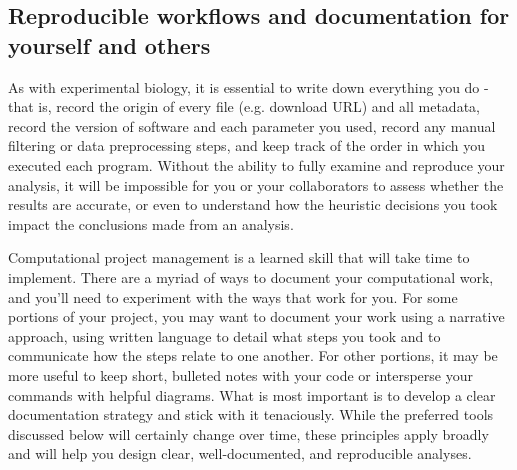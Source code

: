 \documentclass[10pt,letterpaper]{article}
\begin{document}




\subsection*{Reproducible workflows and documentation for yourself and others}
As with experimental biology, it is essential to write down everything you do - that is, record the origin of every file (e.g. download URL) and all metadata, record the version of software and each parameter you used, record any manual filtering or data preprocessing steps, and keep track of the order in which you executed each program. 
Without the ability to fully examine and reproduce your analysis, it will be impossible for you or your collaborators to assess whether the results are accurate, or even to understand how the heuristic decisions you took impact the conclusions made from an analysis. 

Computational project management is a learned skill that will take time to implement. There are a myriad of ways to document your computational work, and you'll need to experiment with the ways that work for you. 
For some portions of your project, you may want to document your work using a narrative approach, using written language to detail what steps you took and to communicate how the steps relate to one another. 
For other portions, it may be more useful to keep short, bulleted notes with your code or intersperse your commands with helpful diagrams. 
What is most important is to develop a clear documentation strategy and stick with it tenaciously. 
While the preferred tools discussed below will certainly change over time, these principles apply broadly and will help you design clear, well-documented, and reproducible analyses.
\end{document}

